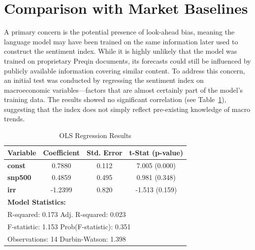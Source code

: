 \section{Comparison with Market Baselines}\label{sec:comparison-with-public-market-baselines}

A primary concern is the potential presence of look-ahead bias, meaning the language model may have been trained on the same information later used to construct the sentiment index.
While it is highly unlikely that the model was trained on proprietary Preqin documents, its forecasts could still be influenced by publicly available information covering similar content.
To address this concern, an initial test was conducted by regressing the sentiment index on macroeconomic variables—factors that are almost certainly part of the model's training data.
The results showed no significant correlation (see Table~\ref{tab:ols_market}), suggesting that the index does not simply reflect pre-existing knowledge of macro trends.


\begin{table}[H]
        \centering
        \caption{OLS Regression Results}
        \begin{tabular}{lccc}
        \toprule
        \textbf{Variable} & \textbf{Coefficient} & \textbf{Std. Error} & \textbf{t-Stat (p-value)} \\
        \midrule
        \textbf{const}   & 0.7880 & 0.112  & 7.005 \; (0.000) \\
        \textbf{snp500}  & 0.4859 & 0.495  & 0.981 \; (0.348) \\
        \textbf{irr}     & -1.2399 & 0.820 & -1.513 \; (0.159) \\
        \midrule
        \multicolumn{4}{l}{\textbf{Model Statistics:}} \\
        \multicolumn{4}{l}{R-squared: 0.173 \quad Adj. R-squared: 0.023} \\
        \multicolumn{4}{l}{F-statistic: 1.153 \quad Prob(F-statistic): 0.351} \\
        \multicolumn{4}{l}{Observations: 14 \quad Durbin-Watson: 1.398} \\
        \bottomrule
        \end{tabular}
        \label{tab:ols_market}
    \end{table}



